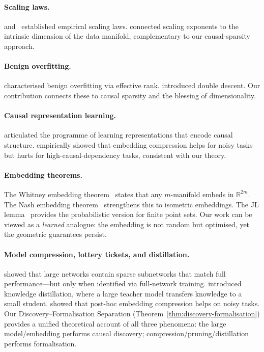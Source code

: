 \documentclass[11pt,a4paper]{article}
\theoremstyle{plain}
\theoremstyle{definition}
\theoremstyle{remark}
\newcommand{\R}{\mathbb{R}}
\begin{document}
\paragraph{Scaling laws.}
\citet{kaplan2020scaling} and~\citet{hoffmann2022training} established empirical
scaling laws.  \citet{sharma2022scaling} connected scaling exponents to the
intrinsic dimension of the data manifold, complementary to our causal-sparsity
approach.

\paragraph{Benign overfitting.}
\citet{bartlett2020benign} characterised benign overfitting via effective rank.
\citet{belkin2019reconciling} introduced double descent.  Our contribution
connects these to causal sparsity and the blessing of dimensionality.

\paragraph{Causal representation learning.}
\citet{scholkopf2021toward} articulated the programme of learning
representations that encode causal structure.
\citet{drinkall2025dimensionality} empirically showed that embedding compression
helps for noisy tasks but hurts for high-causal-dependency tasks, consistent with
our theory.

\paragraph{Embedding theorems.}
The Whitney embedding theorem~\citep{whitney1936differentiable} states that any
$m$-manifold embeds in $\R^{2m}$.  The Nash embedding
theorem~\citep{nash1956imbedding} strengthens this to isometric embeddings.  The
JL lemma~\citep{johnson1984extensions} provides the probabilistic version for
finite point sets.  Our work can be viewed as a \emph{learned} analogue: the
embedding is not random but optimised, yet the geometric guarantees persist.

\paragraph{Model compression, lottery tickets, and distillation.}
\citet{frankle2019lottery} showed that large networks contain sparse subnetworks
that match full performance---but only when identified via full-network training.
\citet{hinton2015distilling} introduced knowledge distillation, where a large
teacher model transfers knowledge to a small student.
\citet{drinkall2025dimensionality} showed that post-hoc embedding compression
helps on noisy tasks.  Our Discovery--Formalisation Separation
(Theorem~\ref{thm:discovery-formalisation}) provides a unified theoretical
account of all three phenomena: the large model/embedding performs causal
discovery; compression/pruning/distillation performs formalisation.
\end{document}
